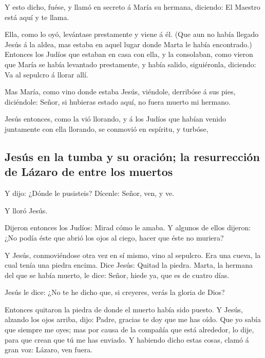  Y esto dicho, fuése, y llamó en secreto á María su
hermana, diciendo: El Maestro está aquí y te llama.

 Ella, como lo oyó, levántase prestamente y viene á él.
 (Que aun no había llegado Jesús á la aldea, mas estaba en
aquel lugar donde Marta le había encontrado.)  Entonces los
Judíos que estaban en casa con ella, y la consolaban, como vieron que
María se había levantado prestamente, y había salido, siguiéronla,
diciendo: Va al sepulcro á llorar allí.

 Mas María, como vino donde estaba Jesús, viéndole,
derribóse á sus pies, diciéndole: Señor, si hubieras estado aquí, no
fuera muerto mi hermano.

 Jesús entonces, como la vió llorando, y á los Judíos que
habían venido juntamente con ella llorando, se conmovió en espíritu, y
turbóse,

\hypertarget{jesuxfas-en-la-tumba-y-su-oraciuxf3n-la-resurrecciuxf3n-de-luxe1zaro-de-entre-los-muertos}{%
\subsection{Jesús en la tumba y su oración; la resurrección de Lázaro de
entre los
muertos}\label{jesuxfas-en-la-tumba-y-su-oraciuxf3n-la-resurrecciuxf3n-de-luxe1zaro-de-entre-los-muertos}}

 Y dijo: ¿Dónde le pusisteis? Dícenle: Señor, ven, y ve.

 Y lloró Jesús.

 Dijeron entonces los Judíos: Mirad cómo le amaba.
 Y algunos de ellos dijeron: ¿No podía éste que abrió los
ojos al ciego, hacer que éste no muriera?

 Y Jesús, conmoviéndose otra vez en sí mismo, vino al
sepulcro. Era una cueva, la cual tenía una piedra encima. 
Dice Jesús: Quitad la piedra. Marta, la hermana del que se había muerto,
le dice: Señor, hiede ya, que es de cuatro días.

 Jesús le dice: ¿No te he dicho que, si creyeres, verás la
gloria de Dios?

 Entonces quitaron la piedra de donde el muerto había sido
puesto. Y Jesús, alzando los ojos arriba, dijo: Padre, gracias te doy
que me has oído.  Que yo sabía que siempre me oyes; mas por
causa de la compañía que está alrededor, lo dije, para que crean que tú
me has enviado.  Y habiendo dicho estas cosas, clamó á gran
voz: Lázaro, ven fuera.

